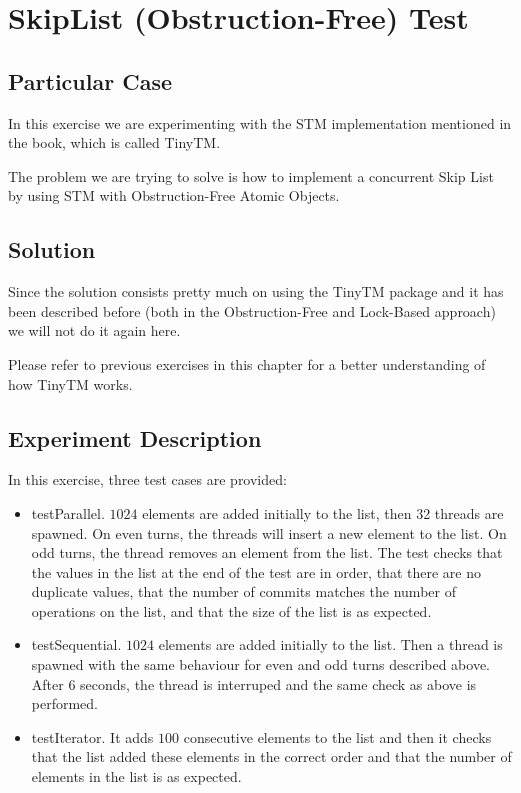 \section{\textbf{SkipList (Obstruction-Free) Test}}
\subsection{Particular Case}
\par
In this exercise we are experimenting with the STM implementation mentioned in
the book, which is called TinyTM. 
\par
The problem we are trying to solve is how to implement a concurrent Skip List by
using STM with Obstruction-Free Atomic Objects.
\par
\subsection{Solution}
\par
Since the solution consists pretty much on using the TinyTM package and it has
been described before (both in the Obstruction-Free and Lock-Based approach) we
will not do it again here.
\par
Please refer to previous exercises in this chapter for a better understanding of
how TinyTM works.
\par
\subsection{Experiment Description}
\par
In this exercise, three test cases are provided:
\begin{itemize}
\item testParallel. $1024$ elements are added initially to the list, then 32
threads are spawned. On even turns, the threads will insert a new element to the
list. On odd turns, the thread removes an element from the list. The test checks
that the values in the list at the end of the test are in order, that there are
no duplicate values, that the number of commits matches the number of operations
on the list, and that the size of the list is as expected.
\item testSequential. $1024$ elements are added initially to the list. Then a
thread is spawned with the same behaviour for even and odd turns described
above. After $6$ seconds, the thread is interruped and the same check as above
is performed.
\item testIterator. It adds $100$ consecutive elements to the list and then it
checks that the list added these elements in the correct order and that the
number of elements in the list is as expected.
\end{itemize}
\par
